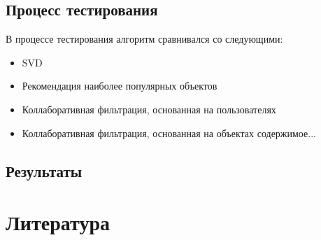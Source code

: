 \documentclass[12pt]{article} %
\begin{document}
\subsection{Процесс тестирования}
В процессе тестирования алгоритм сравнивался со следующими:
\begin{itemize}
\item SVD
\item Рекомендация наиболее популярных объектов
\item Коллаборативная фильтрация, основанная на пользователях
\item Коллаборативная фильтрация, основанная на объектах
содержимое...
\end{itemize}


\subsection{Результаты}


\section{Литература}
\end{document}
